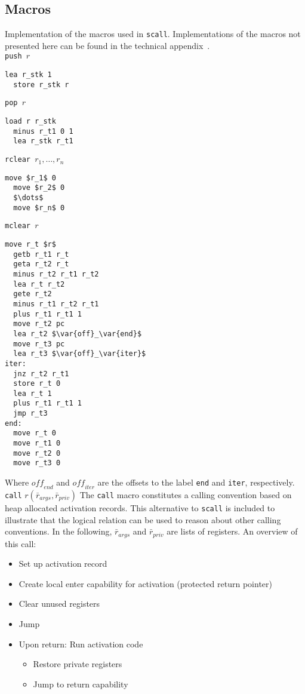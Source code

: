 \documentclass[format=acmsmall, review=true, screen=true]{acmart}
\newcommand{\var}[1]{\mathit{#1}}
\begin{document}
\subsection{Macros}
\label{app:macros}
Implementation of the macros used in \texttt{scall}. Implementations of the
macros not presented here can be found in the technical
appendix~\citep{technical_appendix}.\\
\texttt{push $r$}
\begin{lstlisting}[xleftmargin=0.4cm]
  lea r_stk 1
  store r_stk r
\end{lstlisting}
\texttt{pop $r$}
\begin{lstlisting}[xleftmargin=0.4cm]
  load r r_stk
  minus r_t1 0 1
  lea r_stk r_t1
\end{lstlisting}
\texttt{rclear $r_1,\dots, r_n$}
\begin{lstlisting}[xleftmargin=0.4cm]
  move $r_1$ 0
  move $r_2$ 0
  $\dots$
  move $r_n$ 0
\end{lstlisting}
\texttt{mclear $r$}
\begin{lstlisting}[xleftmargin=0.4cm]
  move r_t $r$
  getb r_t1 r_t
  geta r_t2 r_t
  minus r_t2 r_t1 r_t2
  lea r_t r_t2
  gete r_t2
  minus r_t1 r_t2 r_t1
  plus r_t1 r_t1 1
  move r_t2 pc
  lea r_t2 $\var{off}_\var{end}$ 
  move r_t3 pc
  lea r_t3 $\var{off}_\var{iter}$
iter:
  jnz r_t2 r_t1
  store r_t 0
  lea r_t 1
  plus r_t1 r_t1 1
  jmp r_t3
end:
  move r_t 0
  move r_t1 0
  move r_t2 0
  move r_t3 0
\end{lstlisting}
Where $\var{off}_\var{end}$ and $\var{off}_\var{iter}$ are the offsets to the label \texttt{end} %
and \texttt{iter}, %
respectively.
\newline\newline
\texttt{call} $r(\bar{r}_{\var{args}},\bar{r}_{\var{priv}})$
\newline
The \texttt{call} macro constitutes a calling convention based on heap allocated activation records.
This alternative to \texttt{scall} is included to illustrate that the logical relation can be used to reason about other calling conventions.
In the following, $\bar{r}_{\var{args}}$ and $\bar{r}_{\var{priv}}$ are lists of registers. An overview of this call:
\begin{itemize}
\item Set up activation record
\item Create local enter capability for activation (protected return pointer)
\item Clear unused registers
\item Jump
\item Upon return: Run activation code
  \begin{itemize}
  \item Restore private registers
  \item Jump to return capability
  \end{itemize}
\end{itemize}
\end{document}
